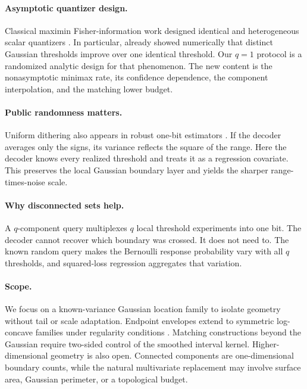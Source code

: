 \documentclass{article}
\theoremstyle{definition}
\theoremstyle{remark}
\newcommand{\1}{\mathbf 1}
\begin{document}
\paragraph{Asymptotic quantizer design.} Classical maximin Fisher-information work designed identical and heterogeneous scalar quantizers \citep{venkitasubramaniam2006minimax,venkitasubramaniam2007quantization,kar2012optimal}. In particular, \citet{venkitasubramaniam2007quantization} already showed numerically that distinct Gaussian thresholds improve over one identical threshold. Our \(q=1\) protocol is a randomized analytic design for that phenomenon. The new content is the nonasymptotic minimax rate, its confidence dependence, the component interpolation, and the matching lower budget.

\paragraph{Public randomness matters.} Uniform dithering also appears in robust one-bit estimators \citep{abdalla2026robust}. If the decoder averages only the signs, its variance reflects the square of the range. Here the decoder knows every realized threshold and treats it as a regression covariate. This preserves the local Gaussian boundary layer and yields the sharper range-times-noise scale.

\paragraph{Why disconnected sets help.} A \(q\)-component query multiplexes \(q\) local threshold experiments into one bit. The decoder cannot recover which boundary was crossed. It does not need to. The known random query makes the Bernoulli response probability vary with all \(q\) thresholds, and squared-loss regression aggregates that variation.

\paragraph{Scope.} We focus on a known-variance Gaussian location family to isolate geometry without tail or scale adaptation. Endpoint envelopes extend to symmetric log-concave families under regularity conditions \citep{kipnis2022mean,kumar2026onebit}. Matching constructions beyond the Gaussian require two-sided control of the smoothed interval kernel. Higher-dimensional geometry is also open. Connected components are one-dimensional boundary counts, while the natural multivariate replacement may involve surface area, Gaussian perimeter, or a topological budget.
\end{document}
